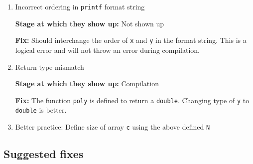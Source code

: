 \begin{enumerate}
      \item Incorrect ordering in \texttt{printf} format string

            \textbf{Stage at which they show up:}
            Not shown up

            \textbf{Fix:}
            Should interchange the order of \texttt{x} and \texttt{y} in the format string.
            This is a logical error and will not throw an error during compilation.

      \item Return type mismatch

            \textbf{Stage at which they show up:}
            Compilation

            \textbf{Fix:}
            The function \texttt{poly} is defined to return a \texttt{double}.
            Changing type of \texttt{y}  to \texttt{double} is better.

      \item Better practice: Define size of array \texttt{c} using the above defined \texttt{N}

\end{enumerate}

\subsection*{Suggested fixes}



